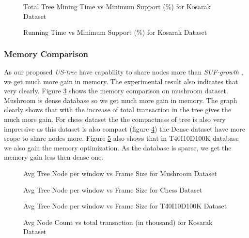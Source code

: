 			\begin{figure}[h]
			\centering
				
			\caption{Total Tree Mining Time vs Minimum Support (\%) for Kosarak Dataset }
			\label{result:g_k_mining_total}
			\end{figure}

			\begin{figure}[h]
			\centering
				
			\caption{Running Time vs Minimum Support (\%) for Kosarak Dataset }
			\label{result:g_k_total}
			\end{figure}
			
\clearpage
	\subsubsection{Memory Comparison}
		As our proposed \emph{US-tree} have capability to share nodes more than \emph{SUF-growth} , we get much more gain in memory. The experimental result also indicates that very clearly. Figure \ref{result:g_m_memory_node} shows the memory comparison on mushroom dataset. Mushroom is dense database so we get  much more gain in memory. The graph clearly shows that with the increase of total transaction in the tree gives the much more gain. For chess dataset the the compactness of tree is also very impressive as this dataset is also compact (figure \ref{result:g_chess_memory_node}) the Dense dataset have more scope to share nodes more. Figure \ref{result:g_t10_memory_node} also shows that in T40I10D100K database we also gain the memory optimization. As the database is sparse, we get the memory gain less then dense one.
			\begin{figure}[h]
			\centering
				
			\caption{Avg Tree Node per window vs Frame Size for Mushroom Dataset }
			\label{result:g_m_memory_node}
			\end{figure}
			
			\begin{figure}[h]
			\centering
				
			\caption{Avg Tree Node per window vs Frame Size for Chess Dataset }
			\label{result:g_chess_memory_node}
			\end{figure}
			
			\begin{figure}[h]
				
			\caption{Avg Tree Node per window vs Frame Size for T40I10D100K Dataset }
			\label{result:g_t10_memory_node}
			\end{figure}
		
			\begin{figure}[h]
			\centering
				
			\caption{Avg Node Count vs total transaction (in thousand) for Kosarak Dataset }
			\label{result:g_k_memory_node}
			\end{figure}